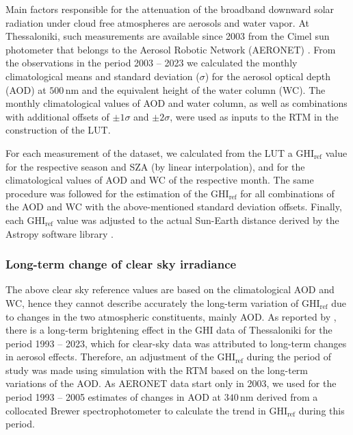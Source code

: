 \documentclass[preprint, 5p,
authoryear]{elsarticle} %
\begin{document}
Main factors responsible for the attenuation of the broadband downward
solar radiation under cloud free atmospheres are aerosols and water
vapor. At Thessaloniki, such measurements are available since 2003 from
the Cimel sun photometer that belongs to the Aerosol Robotic Network
(AERONET) \citep{Giles2019, Buis1998}. From the observations in the
period 2003 -- 2023 we calculated the monthly climatological means and
standard deviation (\(\sigma\)) for the aerosol optical depth (AOD) at
\(500\,\text{nm}\) and the equivalent height of the water column (WC).
The monthly climatological values of AOD and water column, as well as
combinations with additional offsets of \(\pm1\sigma\) and
\(\pm2\sigma\), were used as inputs to the RTM in the construction of
the LUT.

For each measurement of the dataset, we calculated from the LUT a
\(\text{GHI}_\text{ref}\) value for the respective season and SZA (by
linear interpolation), and for the climatological values of AOD and WC
of the respective month. The same procedure was followed for the
estimation of the \(\text{GHI}_\text{ref}\) for all combinations of the
AOD and WC with the above-mentioned standard deviation offsets. Finally,
each \(\text{GHI}_\text{ref}\) value was adjusted to the actual
Sun-Earth distance derived by the Astropy software library
\citep{AstropyCollaboration2022}.

\subsubsection{Long-term change of clear sky
irradiance}\label{long-term-change-of-clear-sky-irradiance}

The above clear sky reference values are based on the climatological AOD
and WC, hence they cannot describe accurately the long-term variation of
\(\text{GHI}_\text{ref}\) due to changes in the two atmospheric
constituents, mainly AOD. As reported by \citet{Natsis2023}, there is a
long-term brightening effect in the GHI data of Thessaloniki for the
period 1993 -- 2023, which for clear-sky data was attributed to
long-term changes in aerosol effects. Therefore, an adjustment of the
\(\text{GHI}_\text{ref}\) during the period of study was made using
simulation with the RTM based on the long-term variations of the AOD. As
AERONET data start only in 2003, we used for the period 1993 -- 2005
estimates of changes in AOD at \(340\,\text{nm}\) derived from a
collocated Brewer spectrophotometer \citep{Kazadzis2007} to calculate
the trend in \(\text{GHI}_\text{ref}\) during this period.
\end{document}
